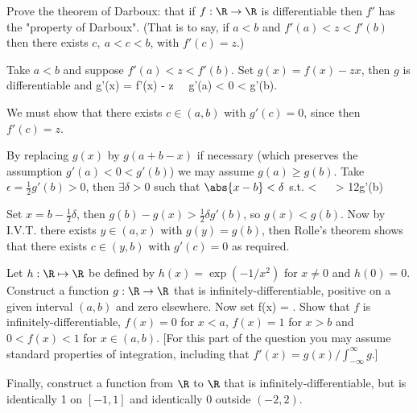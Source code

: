 \begin{problem}
Prove the theorem of Darboux: that if $f : \R \to \R$ is differentiable then $f'$ has the "property of Darboux". (That is to say, if $a < b$ and $f'(a) < z < f'(b)$ then there exists $c,\ a < c < b$, with $f'(c) = z$.)
\end{problem}

\begin{solution}[\bf Solution.]
Take $a<b$ and suppose $f'(a)<z<f'(b)$. Set $g(x) = f(x)-zx$, then $g$ is differentiable and 
\be
g'(x) = f'(x) - z \ \ra \ g'(a) < 0 < g'(b).
\ee

We must show that there exists $c\in (a,b)$ with $g'(c) = 0$, since then $f'(c) =z$.

By replacing $g(x)$ by $g(a+b-x)$ if necessary (which preserves the assumption $g'(a) <0< g'(b)$) we may assume $g(a)\geq g(b)$. Take $\epsilon = \frac 12 g'(b)>0$, then $\exists \delta >0$ such that $\abs{x-b}<\delta$ s.t. 
\be
{} < \epsilon \ \ra \  > \frac 12g'(b)
\ee

Set $x=b-\frac 12 \delta$, then $g(b)-g(x) > \frac 12 \delta g'(b)$, so $g(x)<g(b)$. Now by I.V.T. there exists $y\in (a,x)$ with $g(y)=g(b)$, then Rolle's theorem shows that there exists $c\in(y,b)$ with $g'(c)=0$ as required.
\end{solution}

\begin{problem}
Let $h : \R \mapsto \R$ be defined by $h(x) = \exp(-1/x^2)$ for $x \neq 0$ and $h(0) = 0$. Construct a function $g : \R \to \R$ that is infinitely-differentiable, positive on a given interval $(a, b)$ and zero elsewhere. Now set 
\be
f(x) = .
\ee
Show that $f$ is infinitely-differentiable, $f(x) = 0$ for $x < a$, $f(x) = 1$ for $x > b$ and $0 < f(x) < 1$ for $x \in (a, b)$. [For this part of the question you may assume standard properties of integration, including that $f'(x) = g(x)/\int^\infty_{-\infty} g$.]

Finally, construct a function from $\R$ to $\R$ that is infinitely-differentiable, but is identically 1 on $[-1, 1]$ and identically 0 outside $(-2, 2)$.
\end{problem}

